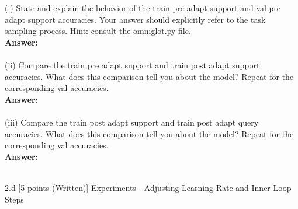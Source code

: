 \begin{answer}


    \large
    (i) State and explain the behavior of the train pre adapt support and val pre adapt support accuracies. Your answer should explicitly refer to the task sampling process. Hint: consult the omniglot.py file.
    \normalsize
    \\

    \textbf{Answer:}
    \\
    \\

    \large
    (ii) Compare the train pre adapt support and train post adapt support accuracies. What does this comparison tell you about the model? Repeat for the corresponding val accuracies.
    \normalsize
    \\
    
    \textbf{Answer:}
    \\
    \\

    \large
    (iii) Compare the train post adapt support and train post adapt query accuracies. What does this comparison tell you about the model? Repeat for the corresponding val accuracies.
    \normalsize
    \\

    \textbf{Answer:}
    \\
    \\
    

\end{answer}


\clearpage

\LARGE
2.d [5 points (Written)] Experiments - Adjusting Learning Rate and Inner Loop Steps
\\
\normalsize



